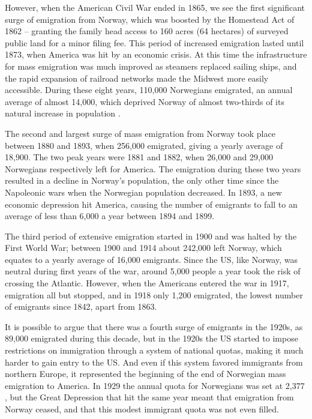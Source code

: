 \documentclass[output=paper]{langscibook}
\begin{document}
However, when the American Civil War ended in 1865, we see the first significant surge of emigration from Norway, which was boosted by the Homestead Act of 1862 – granting the family head access to 160 acres (64 hectares) of surveyed public land for a minor filing fee. This period of increased emigration lasted until 1873, when America was hit by an economic crisis. At this time the infrastructure for mass emigration was much improved as steamers replaced sailing ships, and the rapid expansion of railroad networks made the Midwest more easily accessible. During these eight years, 110,000 Norwegians emigrated, an annual average of almost 14,000, which deprived Norway of almost two-thirds of its natural increase in population \citep[16]{Lovoll1984}. 

The second and largest surge of mass emigration from Norway took place between 1880 and 1893, when 256,000 emigrated, giving a yearly average of 18,900. The two peak years were 1881 and 1882, when 26,000 and 29,000 Norwegians respectively left for America. The emigration during these two years resulted in a decline in Norway’s population, the only other time since the Napoleonic wars when the Norwegian population decreased. In 1893, a new economic depression hit America, causing the number of emigrants to fall to an average of less than 6,000 a year between 1894 and 1899. 

The third period of extensive emigration started in 1900 and was halted by the First World War; between 1900 and 1914 about 242,000 left Norway, which equates to a yearly average of 16,000 emigrants. Since the US, like Norway, was neutral during first years of the war, around 5,000 people a year took the risk of crossing the Atlantic. However, when the Americans entered the war in 1917, emigration all but stopped, and in 1918 only 1,200 emigrated, the lowest number of emigrants since 1842, apart from 1863. 

It is possible to argue that there was a fourth surge of emigrants in the 1920s, as 89,000 emigrated during this decade, but in the 1920s the US started to impose restrictions on immigration through a system of national quotas, making it much harder to gain entry to the US. And even if this system favored immigrants from northern Europe, it represented the beginning of the end of Norwegian mass emigration to America. In 1929 the annual quota for Norwegians was set at 2,377 \citep[29]{Lovoll1984}, but the Great Depression that hit the same year meant that emigration from Norway ceased, and that this modest immigrant quota was not even filled.
\end{document}
